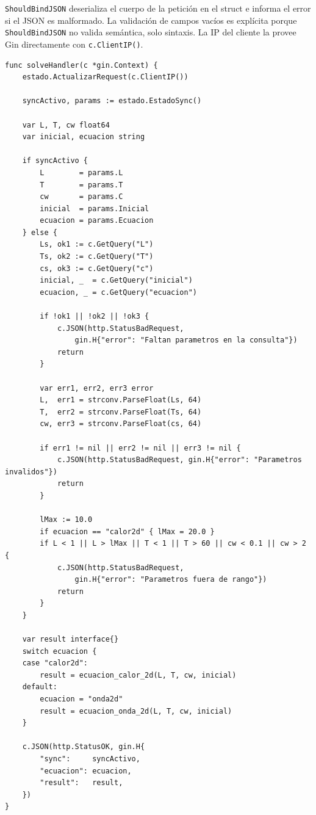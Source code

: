 \documentclass[12pt, a4paper]{article}
\begin{document}
\texttt{ShouldBindJSON} deserializa el cuerpo de la petición en el struct e informa el
error si el JSON es malformado. La validación de campos vacíos es explícita porque
\texttt{ShouldBindJSON} no valida semántica, solo sintaxis. La IP del cliente la
provee Gin directamente con \texttt{c.ClientIP()}.

\begin{lstlisting}[style=golang, caption={\texttt{handlers.go} — calculo de la EDP}]
func solveHandler(c *gin.Context) {
    estado.ActualizarRequest(c.ClientIP())

    syncActivo, params := estado.EstadoSync()

    var L, T, cw float64
    var inicial, ecuacion string

    if syncActivo {
        L        = params.L
        T        = params.T
        cw       = params.C
        inicial  = params.Inicial
        ecuacion = params.Ecuacion
    } else {
        Ls, ok1 := c.GetQuery("L")
        Ts, ok2 := c.GetQuery("T")
        cs, ok3 := c.GetQuery("c")
        inicial, _  = c.GetQuery("inicial")
        ecuacion, _ = c.GetQuery("ecuacion")

        if !ok1 || !ok2 || !ok3 {
            c.JSON(http.StatusBadRequest,
                gin.H{"error": "Faltan parametros en la consulta"})
            return
        }

        var err1, err2, err3 error
        L,  err1 = strconv.ParseFloat(Ls, 64)
        T,  err2 = strconv.ParseFloat(Ts, 64)
        cw, err3 = strconv.ParseFloat(cs, 64)

        if err1 != nil || err2 != nil || err3 != nil {
            c.JSON(http.StatusBadRequest, gin.H{"error": "Parametros invalidos"})
            return
        }

        lMax := 10.0
        if ecuacion == "calor2d" { lMax = 20.0 }
        if L < 1 || L > lMax || T < 1 || T > 60 || cw < 0.1 || cw > 2 {
            c.JSON(http.StatusBadRequest,
                gin.H{"error": "Parametros fuera de rango"})
            return
        }
    }

    var result interface{}
    switch ecuacion {
    case "calor2d":
        result = ecuacion_calor_2d(L, T, cw, inicial)
    default:
        ecuacion = "onda2d"
        result = ecuacion_onda_2d(L, T, cw, inicial)
    }

    c.JSON(http.StatusOK, gin.H{
        "sync":     syncActivo,
        "ecuacion": ecuacion,
        "result":   result,
    })
}
\end{lstlisting}
\end{document}
